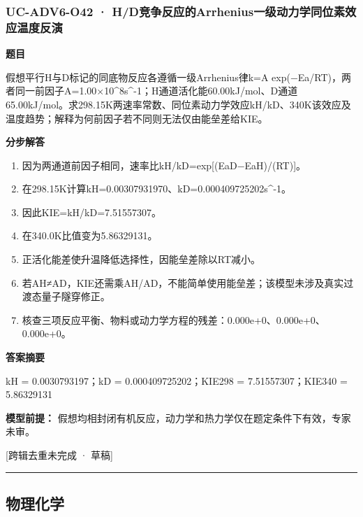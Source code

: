 \documentclass[UTF8,11pt,a4paper]{ctexart}
\begin{document}
\subsubsection*{UC-ADV6-O42 · H/D竞争反应的Arrhenius一级动力学同位素效应温度反演}
\noindent\textbf{题目}\par
假想平行H与D标记的同底物反应各遵循一级Arrhenius律k=A exp(−Ea/RT)，两者同一前因子A=1.00×10\textasciicircum{}8s\textasciicircum{}-1；H通道活化能60.00kJ/mol、D通道65.00kJ/mol。求298.15K两速率常数、同位素动力学效应kH/kD、340K该效应及温度趋势；解释为何前因子若不同则无法仅由能垒差给KIE。\par
\medskip\noindent\textbf{分步解答}
\begin{enumerate}
\item 因为两通道前因子相同，速率比kH/kD=exp[(EaD−EaH)/(RT)]。
\item 在298.15K计算kH=0.00307931970、kD=0.000409725202s\textasciicircum{}-1。
\item 因此KIE=kH/kD=7.51557307。
\item 在340.0K比值变为5.86329131。
\item 正活化能差使升温降低选择性，因能垒差除以RT减小。
\item 若AH≠AD，KIE还需乘AH/AD，不能简单使用能垒差；该模型未涉及真实过渡态量子隧穿修正。
\item 核查三项反应平衡、物料或动力学方程的残差：0.000e+0、0.000e+0、0.000e+0。
\end{enumerate}
\noindent\textbf{答案摘要}\par
kH = 0.0030793197；kD = 0.000409725202；KIE298 = 7.51557307；KIE340 = 5.86329131\par
\noindent\textbf{模型前提：}
假想均相封闭有机反应，动力学和热力学仅在题定条件下有效，专家未审。\par
\noindent\textcolor{red!65!black}{[跨辑去重未完成 · 草稿]} \par
\medskip\hrule\medskip
\subsection*{物理化学}
\end{document}
